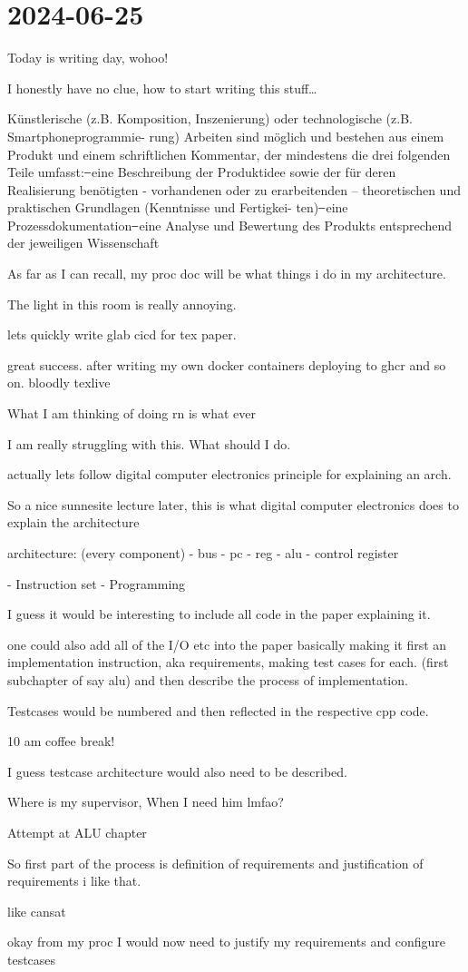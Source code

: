 \section{2024-06-25} %
\label{sec:2024-06-25}
Today is writing day, wohoo!

I honestly have no clue, how to start writing this stuff\dots

Künstlerische (z.B. Komposition, Inszenierung) oder technologische (z.B. Smartphoneprogrammie-
rung) Arbeiten sind möglich und bestehen aus einem Produkt und einem schriftlichen Kommentar,
der mindestens die drei folgenden Teile umfasst:
̶ eine Beschreibung der Produktidee sowie der für deren Realisierung benötigten - vorhandenen
oder zu erarbeitenden – theoretischen und praktischen Grundlagen (Kenntnisse und Fertigkei-
ten)
̶ eine Prozessdokumentation
̶ eine Analyse und Bewertung des Produkts entsprechend der jeweiligen Wissenschaft

As far as I can recall, my proc doc will be what things i do in my architecture. 

The light in this room is really annoying.

lets quickly write glab cicd for tex paper.

great success. after writing my own docker containers deploying to ghcr and so on. bloodly texlive



What I am thinking of doing rn is what ever

I am really struggling with this. What should I do. 

actually lets follow digital computer electronics principle for explaining an arch. 


So a nice sunnesite lecture later, this is what digital computer electronics does to explain the architecture

architecture:
(every component)
- bus
- pc
- reg
- alu
- control register 

- Instruction set
- Programming

I guess it would be interesting to include all code in the paper explaining it. 

one could also add all of the I/O etc into the paper
basically making it first an implementation instruction, aka requirements, making test cases for each. (first subchapter of say alu) and then describe the process of implementation. 

Testcases would be numbered and then reflected in the respective cpp code. 

10 am coffee break!

I guess testcase architecture would also need to be described. 

Where is my supervisor, When I need him lmfao?

Attempt at ALU chapter

So first part of the process is definition of requirements and justification of requirements
i like that. 

like cansat

okay from my proc I would now need to justify my requirements and configure testcases

